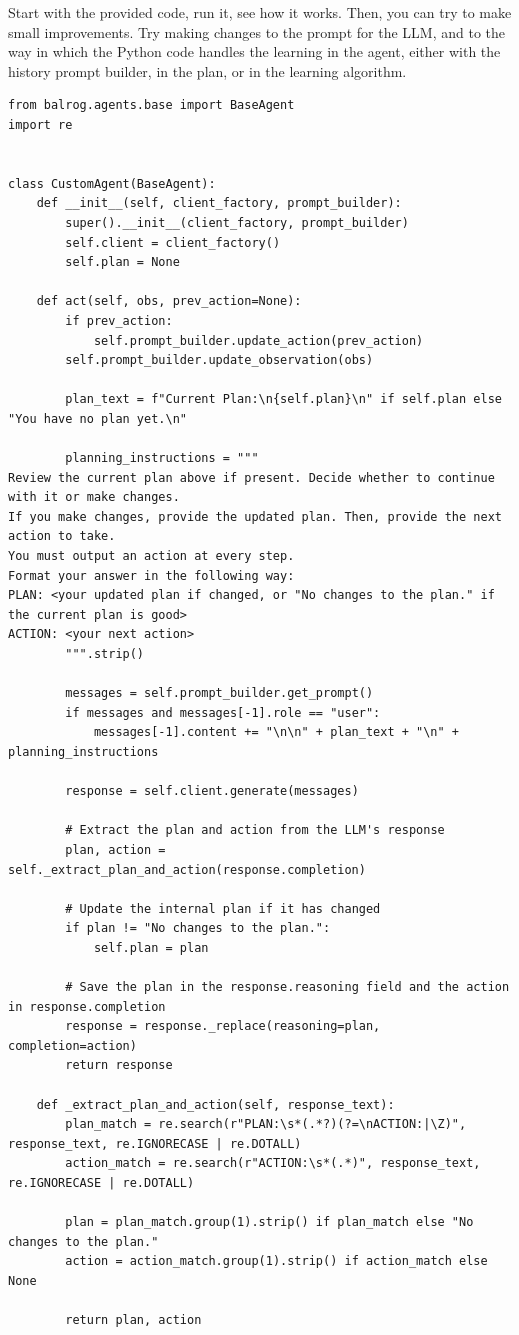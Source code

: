 Start with the provided code, run it, see how it works. Then, you can try to make small improvements. Try making changes to the prompt for the LLM, and to the way in which the Python code handles the learning in the agent, either with the history prompt builder,  in the plan, or in the learning algorithm.

\begin{listing}
\begin{verbatim}
from balrog.agents.base import BaseAgent
import re


class CustomAgent(BaseAgent):
    def __init__(self, client_factory, prompt_builder):
        super().__init__(client_factory, prompt_builder)
        self.client = client_factory()
        self.plan = None

    def act(self, obs, prev_action=None):
        if prev_action:
            self.prompt_builder.update_action(prev_action)
        self.prompt_builder.update_observation(obs)

        plan_text = f"Current Plan:\n{self.plan}\n" if self.plan else "You have no plan yet.\n"

        planning_instructions = """
Review the current plan above if present. Decide whether to continue with it or make changes.
If you make changes, provide the updated plan. Then, provide the next action to take. 
You must output an action at every step.
Format your answer in the following way:
PLAN: <your updated plan if changed, or "No changes to the plan." if the current plan is good>
ACTION: <your next action>
        """.strip()

        messages = self.prompt_builder.get_prompt()
        if messages and messages[-1].role == "user":
            messages[-1].content += "\n\n" + plan_text + "\n" + planning_instructions

        response = self.client.generate(messages)

        # Extract the plan and action from the LLM's response
        plan, action = self._extract_plan_and_action(response.completion)

        # Update the internal plan if it has changed
        if plan != "No changes to the plan.":
            self.plan = plan

        # Save the plan in the response.reasoning field and the action in response.completion
        response = response._replace(reasoning=plan, completion=action)
        return response

    def _extract_plan_and_action(self, response_text):
        plan_match = re.search(r"PLAN:\s*(.*?)(?=\nACTION:|\Z)", response_text, re.IGNORECASE | re.DOTALL)
        action_match = re.search(r"ACTION:\s*(.*)", response_text, re.IGNORECASE | re.DOTALL)

        plan = plan_match.group(1).strip() if plan_match else "No changes to the plan."
        action = action_match.group(1).strip() if action_match else None

        return plan, action
\end{verbatim}
    \caption{Agent code in BALROG}\label{lst:agent}
\end{listing}

